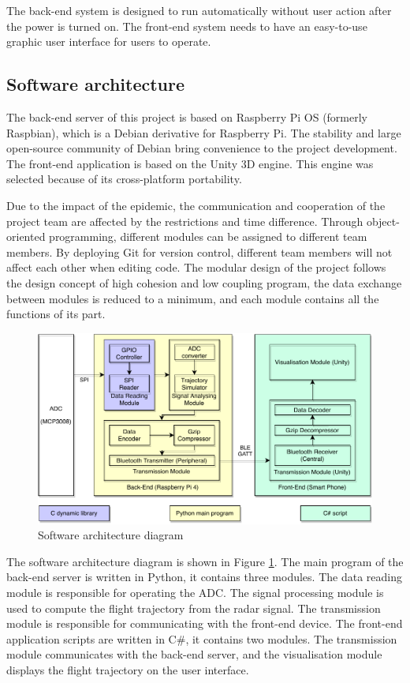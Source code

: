 The back-end system is designed to run automatically without user action after the power is turned on. The front-end system needs to have an easy-to-use graphic user interface for users to operate.



\subsection{Software architecture}
The back-end server of this project is based on Raspberry Pi OS (formerly Raspbian), which is a Debian derivative for Raspberry Pi. The stability and large open-source community of Debian bring convenience to the project development. The front-end application is based on the Unity 3D engine. This engine was selected because of its cross-platform portability.
\par
Due to the impact of the epidemic, the communication and cooperation of the project team are affected by the restrictions and time difference. Through object-oriented programming, different modules can be assigned to different team members. By deploying Git for version control, different team members will not affect each other when editing code. The modular design of the project follows the design concept of high cohesion and low coupling program, the data exchange between modules is reduced to a minimum, and each module contains all the functions of its part.
\begin{figure}[H]
    \centering
    \includegraphics[width=\textwidth]{figure/Software.pdf}
    \caption{Software architecture diagram}
    \label{fig:software_diagram}
\end{figure}
The software architecture diagram is shown in Figure \ref{fig:software_diagram}. The main program of the back-end server is written in Python, it contains three modules. The data reading module is responsible for operating the ADC. The signal processing module is used to compute the flight trajectory from the radar signal. The transmission module is responsible for communicating with the front-end device. The front-end application scripts are written in C\#, it contains two modules. The transmission module communicates with the back-end server, and the visualisation module displays the flight trajectory on the user interface.



